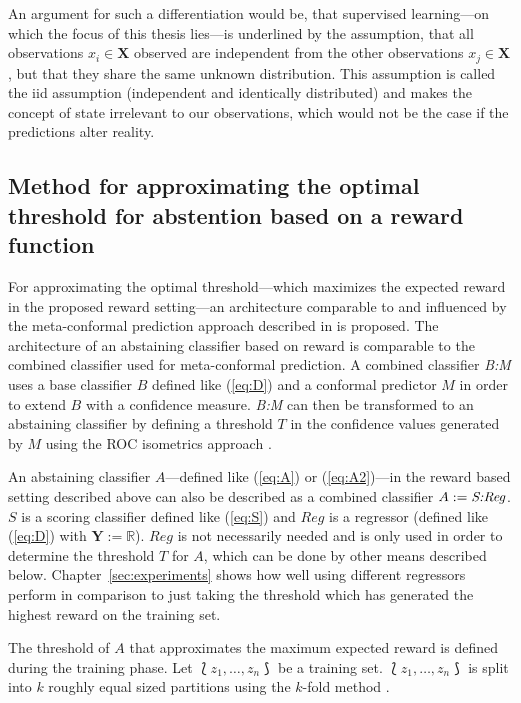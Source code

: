\documentclass[twoside,11pt]{article}
\def\ds{\Lbag z_1,\dots,z_n \Rbag}
\def\X{\textbf{X}}
\def\Y{\textbf{Y}}
\begin{document}
An argument for such a differentiation would be, that
supervised learning---on which the focus of this thesis
lies---is underlined by the assumption, that all
observations $x_i \in \X$ observed are independent from the
other observations $x_j \in \X$, but that they share the
same unknown distribution.
This assumption is called the iid assumption (independent
and identically distributed) \citep[see][]{clauset_2011}
and makes the concept of state irrelevant to our
observations, which would not be the case if the
predictions alter reality.

\subsection{Method for approximating the optimal threshold
  for abstention based on a reward function}

For approximating the optimal threshold---which maximizes
the expected reward in the proposed reward setting---an
architecture comparable to and influenced by the
meta-confor\-mal prediction approach described in
\citet{smirnov_et_al_2009} is proposed.
The architecture of an abstaining classifier based on
reward is comparable to the combined classifier used for
meta-conformal prediction.
A combined classifier \textit{B:M} uses a base classifier
$B$ defined like (\ref{eq:D}) and a conformal predictor $M$
in order to extend $B$ with a confidence measure.
\textit{B:M} can then be transformed to an abstaining
classifier by defining a threshold $T$ in the confidence
values generated by $M$ using the ROC isometrics approach
\citep[see][]{smirnov_et_al_2009, vanderlooy_et_al_2009,
  fassbender_2019}.

An abstaining classifier $A$---defined like (\ref{eq:A}) or
(\ref{eq:A2})---in the reward based
setting described above can also be described as a
combined classifier $A := \text{\textit{S:Reg}}$.
$S$ is a scoring classifier defined like (\ref{eq:S}) and
$Reg$ is a regressor (defined like (\ref{eq:D}) with
$\Y := \mathbb{R}$).
$Reg$ is not necessarily needed and is only used in order
to determine the threshold $T$ for $A$, which can be done
by other means described below.
Chapter~\ref{sec:experiments} shows how well using
different regressors perform in comparison to just taking
the threshold which has generated the highest reward on the
training set.

The threshold of $A$ that approximates the maximum expected
reward is defined during the training phase.
Let $\ds$ be a training set.
$\ds$ is split into $k$ roughly equal sized partitions
using the $k$-fold method \citep[see][Chapter 7.10;
Algorithm~\ref{alg:method}, line 2]{hastie_et_al_2009}.
\end{document}

